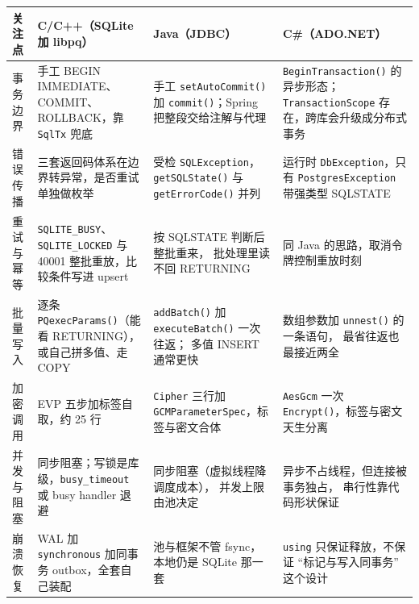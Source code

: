 \documentclass[12pt,a4paper,fontset=fandol]{ctexbook}
\newcommand{\Fn}[1]{\texttt{#1()}}
\newcommand{\Tp}[1]{\texttt{#1}}
\newcommand{\CSharp}{C\#}
\newcommand{\CppJava}{C/C++}
\begin{document}
\begin{footnotesize}
\begin{longtable}{@{}>{\raggedright\arraybackslash}p{}
                  >{\raggedright\arraybackslash}p{}
                  >{\raggedright\arraybackslash}p{}
                  >{\raggedright\arraybackslash}p{}@{}}
\toprule
\textbf{关注点} & \textbf{\CppJava{}（SQLite 加 libpq）} &
\textbf{Java（JDBC）} & \textbf{\CSharp{}（ADO.NET）} \\
\midrule
事务边界 & 手工 BEGIN IMMEDIATE、COMMIT、ROLLBACK，靠 \Tp{SqlTx}
兜底 & 手工 \Fn{setAutoCommit} 加 \Fn{commit}；Spring 把整段交给注解与代理
& \Fn{Begin\allowbreak Transaction} 的异步形态；
\Tp{Transaction\allowbreak Scope} 存在，跨库会升级成分布式事务 \\
错误传播 & 三套返回码体系在边界转异常，是否重试单独做枚举
& 受检 \Tp{SQLException}，\Fn{getSQLState} 与 \Fn{getErrorCode} 并列
& 运行时 \Tp{DbException}，只有 \Tp{Postgres\allowbreak Exception}
带强类型 SQLSTATE \\
重试与幂等 & \Tp{SQLITE\_BUSY}、\Tp{SQLITE\_LOCKED} 与 40001
整批重放，比较条件写进 upsert & 按 SQLSTATE 判断后整批重来，
批处理里读不回 RETURNING & 同 Java 的思路，取消令牌控制重放时刻 \\
批量写入 & 逐条 \Fn{PQexecParams}（能看 RETURNING），
或自己拼多值、走 COPY & \Fn{addBatch} 加 \Fn{executeBatch} 一次往返；
多值 INSERT 通常更快 & 数组参数加 \Fn{unnest} 的一条语句，
最省往返也最接近两全 \\
加密调用 & EVP 五步加标签自取，约 25 行 & \Tp{Cipher} 三行加
\Tp{GCM\allowbreak ParameterSpec}，标签与密文合体 & \Tp{AesGcm}
一次 \Fn{Encrypt}，标签与密文天生分离 \\
并发与阻塞 & 同步阻塞；写锁是库级，\Tp{busy\_\allowbreak timeout}
或 busy handler 退避 & 同步阻塞（虚拟线程降调度成本），
并发上限由池决定 & 异步不占线程，但连接被事务独占，
串行性靠代码形状保证 \\
崩溃恢复 & WAL 加 \Tp{synchronous} 加同事务 outbox，全套自己装配
& 池与框架不管 fsync，本地仍是 SQLite 那一套
& \Tp{using} 只保证释放，不保证 ``标记与写入同事务'' 这个设计 \\
\bottomrule
\end{longtable}
\end{footnotesize}
\end{document}
